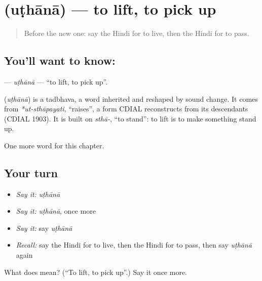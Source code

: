 \section[\texorpdfstring{\hi{उठाना} (uṭhānā)}{उठाना (uṭhānā)}]{ (uṭhānā) — to lift, to pick up}

\label{lesson:HI-C170-uthana}



\begin{quote}
Before the new one: say the Hindi for to live, then the Hindi for to pass.
\end{quote}

\subsection*{You'll want to know: }
\textbf{} — \emph{uṭhānā} — \textquotedblleft{}to lift, to pick up\textquotedblright{}.

\begin{cousinweb}
\textbf{} (\emph{uṭhānā}) is a tadbhava, a word inherited and reshaped by sound change. It comes from \emph{*ut-sthāpayati}, \textquotedblleft{}raises\textquotedblright{}, a form CDIAL reconstructs from its descendants (CDIAL 1903). It is built on \emph{sthā-}, \textquotedblleft{}to stand\textquotedblright{}: to lift is to make something stand up.
\end{cousinweb}

\begin{grammarlens}[title={What you've built}]
One more word for this chapter.
\end{grammarlens}

\subsection*{Your turn}
\begin{itemize}
\raggedright
  \item \emph{Say it:} \emph{uṭhānā}
  \item \emph{Say it:} \emph{uṭhānā}, once more
  \item \emph{Say it:} say \emph{uṭhānā}
  \item \emph{Recall:} say the Hindi for to live, then the Hindi for to pass, then say \emph{uṭhānā} again
\end{itemize}

\begin{tcolorbox}[breakable,colback=teal!4,colframe=teal!35!black,title={Before you move on}]
What does  mean? (\textquotedblleft{}To lift, to pick up\textquotedblright{}.) Say it once more.
\end{tcolorbox}
